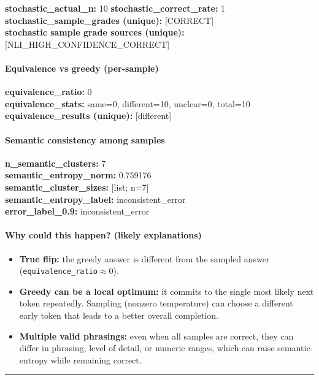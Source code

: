 \documentclass[11pt]{article}
\newcommand{\mono}[1]{\texttt{#1}}
\begin{document}
\normalsize
\textbf{stochastic\_actual\_n:} 10 \quad \textbf{stochastic\_correct\_rate:} 1\\
\textbf{stochastic\_sample\_grades (unique):} [CORRECT]\\
\textbf{stochastic sample grade sources (unique):} [NLI\_HIGH\_CONFIDENCE\_CORRECT]\\
\paragraph{Equivalence vs greedy (per-sample)}
\textbf{equivalence\_ratio:} 0\\
\textbf{equivalence\_stats:} same=0, different=10, unclear=0, total=10\\
\textbf{equivalence\_results (unique):} [different]\\
\paragraph{Semantic consistency among samples}
\textbf{n\_semantic\_clusters:} 7\\
\textbf{semantic\_entropy\_norm:} 0.759176\\
\textbf{semantic\_cluster\_sizes:} [list; n=7]\\
\textbf{semantic\_entropy\_label:} inconsistent\_error\\
\textbf{error\_label\_0.9:} inconsistent\_error\\
\paragraph{Why could this happen? (likely explanations)}
\begin{itemize}
\item \textbf{True flip:} the greedy answer is different from the sampled answer (\mono{equivalence\_ratio}$\approx 0$).
\item \textbf{Greedy can be a local optimum:} it commits to the single most likely next token repeatedly. Sampling (nonzero temperature) can choose a different early token that leads to a better overall completion.
\item \textbf{Multiple valid phrasings:} even when all samples are correct, they can differ in phrasing, level of detail, or numeric ranges, which can raise semantic-entropy while remaining correct.
\end{itemize}
\vspace{10pt}
\hrule
\vspace{10pt}
\end{document}
